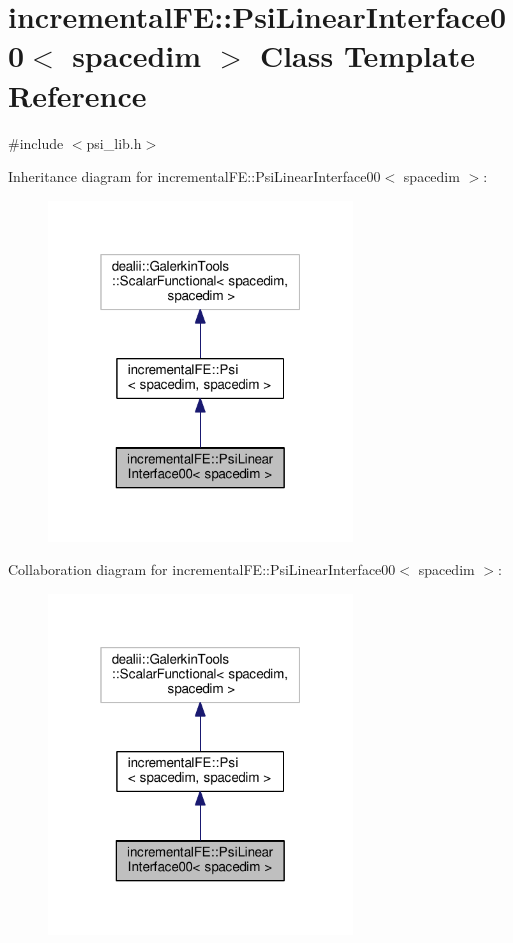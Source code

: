 \hypertarget{classincremental_f_e_1_1_psi_linear_interface00}{}\section{incremental\+FE\+:\+:Psi\+Linear\+Interface00$<$ spacedim $>$ Class Template Reference}
\label{classincremental_f_e_1_1_psi_linear_interface00}


{\ttfamily \#include $<$psi\+\_\+lib.\+h$>$}



Inheritance diagram for incremental\+FE\+:\+:Psi\+Linear\+Interface00$<$ spacedim $>$\+:
\nopagebreak
\begin{figure}[H]
\begin{center}
\leavevmode
\includegraphics[width=229pt]{classincremental_f_e_1_1_psi_linear_interface00__inherit__graph}
\end{center}
\end{figure}


Collaboration diagram for incremental\+FE\+:\+:Psi\+Linear\+Interface00$<$ spacedim $>$\+:
\nopagebreak
\begin{figure}[H]
\begin{center}
\leavevmode
\includegraphics[width=229pt]{classincremental_f_e_1_1_psi_linear_interface00__coll__graph}
\end{center}
\end{figure}
